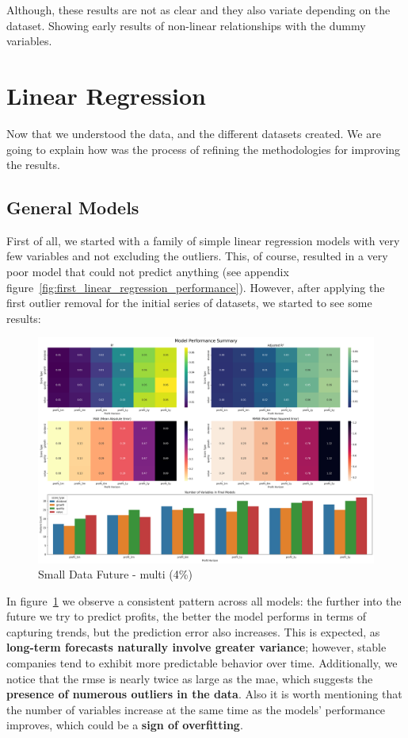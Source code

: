 \documentclass[11pt,english,a4paper,hidelinks]{book}
\begin{document}
\noindent Although, these results are not as clear and they also variate depending on the dataset. Showing early results of non-linear relationships with the dummy variables.

\section{Linear Regression}

Now that we understood the data, and the different datasets created. We are going to explain how was the process of refining the methodologies for improving the results.

\subsection{General Models}

First of all, we started with a family of simple linear regression models with very few variables and not excluding the outliers. This, of course, resulted in a very poor model that could not predict anything (see appendix figure~\ref{fig:first_linear_regression_performance}). However, after applying the first outlier removal for the initial series of datasets, we started to see some results:

\begin{figure}[H]
    \centering
    \includegraphics[width=1\textwidth]{images/code/models/linear_regression/first_model/Small Data future - Multi performance.png}
    \caption{Small Data Future - \acrshort{multi} (4\%)}
    \label{fig:first_linear_regression}
\end{figure}

\noindent In figure~\ref{fig:first_linear_regression} we observe a consistent pattern across all models: the further into the future we try to predict profits, the better the model performs in terms of capturing trends, but the prediction error also increases. This is expected, as \textbf{long-term forecasts naturally involve greater variance}; however, stable companies tend to exhibit more predictable behavior over time. Additionally, we notice that the \acrshort{rmse} is nearly twice as large as the \acrshort{mae}, which suggests the \textbf{presence of numerous outliers in the data}. Also it is worth mentioning that the number of variables increase at the same time as the models' performance improves, which could be a \textbf{sign of overfitting}.
\end{document}
